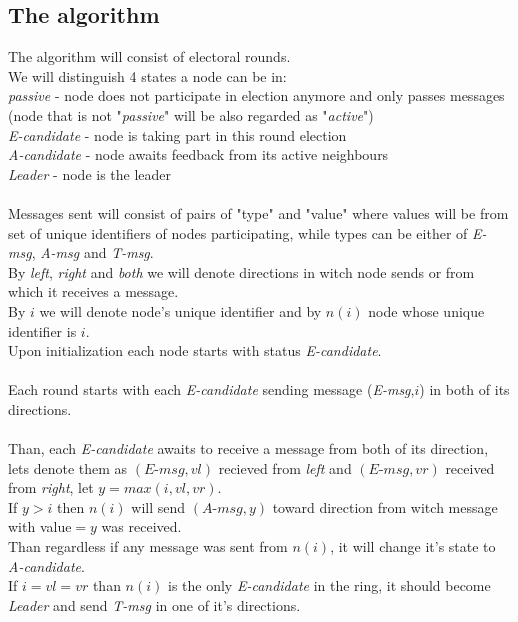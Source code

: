 \documentclass{article}
\begin{document}
\subsection*{The algorithm}
The algorithm will consist of electoral rounds.\\
We will distinguish 4 states a node can be in:\\
\textit{passive} - node does not participate in election anymore and only passes messages\\
(node that is not "\textit{passive}" will be also regarded as "\textit{active}")\\
\textit{E-candidate} - node is taking part in this round election\\ \textit{A-candidate} - node awaits feedback from its active neighbours\\ \textit{Leader} - node is the leader\\
\\
Messages sent will consist of pairs of "type" and "value" where values will be from set of unique identifiers of nodes participating, while types can be  either of \textit{E-msg}, \textit{A-msg} and \textit{T-msg}.\\
By  \textit{left}, \textit{right} and  \textit{both} we will denote directions in witch node sends or from which it receives a message.\\
By $i$ we will denote node's unique identifier and by $n(i)$ node whose unique identifier is $i$.
\\
Upon initialization each node starts with status \textit{E-candidate}.\\
\\
Each round starts with each \textit{E-candidate} sending message (\textit{E-msg},$i$) in both of its directions.\\
\\
Than, each \textit{E-candidate} awaits to receive a message from both of its direction, lets denote them as $(\textit{E-msg},vl)$ recieved from \textit{left} and $(\textit{E-msg},vr)$ received from \textit{right}, let $y=max(i,vl,vr)$. \\
If $y>i$ then $n(i)$ will send $(\textit{A-msg},y)$ toward direction from witch message with value$=y$ was received.\\
Than regardless if any message was sent from $n(i)$, it will change it's state to \textit{A-candidate}.\\
If $i=vl=vr$ than $n(i)$ is the only \textit{E-candidate} in the ring, it should become \textit{Leader} and send \textit{T-msg} in one of it's directions.\\
\end{document}
